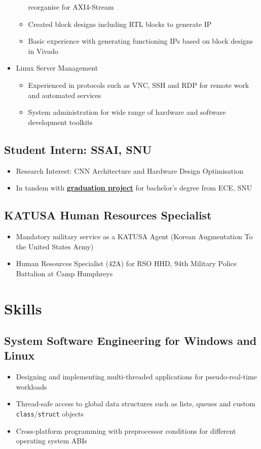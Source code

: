 \documentclass[10pt]{article}
\begin{document}
\begin{itemize}
\begin{itemize}
        reorganise for AXI4-Stream
      \item Created block designs including RTL blocks to generate IP
      \item Basic experience with generating functioning IPs based on block
        designs in Vivado
    \end{itemize}
  \item Linux Server Management
    \begin{itemize}
      \item Experienced in protocols such as VNC, SSH and RDP for remote work
        and automated services
      \item System administration for wide range of hardware and software
        development toolkits
    \end{itemize}
\end{itemize}

\subsection*{Student Intern: SSAI, SNU} \label{intern2}
\begin{itemize}
  \item Research Interest: CNN Architecture and Hardware Design Optimisation
  \item In tandem with \textbf{\hyperref[edu:gradproj]{graduation project}} for
    bachelor's degree from ECE, SNU
\end{itemize}

\subsection*{KATUSA Human Resources Specialist} \label{military}
\begin{itemize}
  \item Mandatory military service as a KATUSA Agent
    (Korean Augmentation To the United States Army)
  \item Human Resources Specialist (42A) for RSO HHD,
    94th Military Police Battalion at Camp Humphreys
\end{itemize}

\section*{Skills} \label{skills}

\subsection*{System Software Engineering for Windows and Linux}
\begin{itemize}
  \item Designing and implementing multi-threaded applications for
    pseudo-real-time workloads
  \item Thread-safe access to global data structures such as lists, queues and
    custom \texttt{class}/\texttt{struct} objects
  \item Cross-platform programming with preprocessor conditions for different
    operating system ABIs
\end{itemize}
\end{document}
